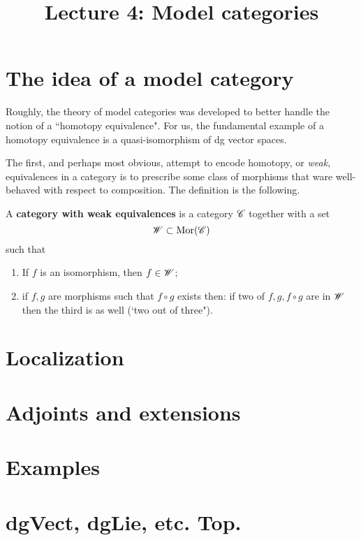 \documentclass[11pt]{amsart}
\title{Lecture 4: Model categories}
\begin{document}
\section{The idea of a model category}
Roughly, the theory of model categories was developed to better handle the notion of a ``homotopy equivalence". 
For us, the fundamental example of a homotopy equivalence is a quasi-isomorphism of dg vector spaces. 

The first, and perhaps most obvious, attempt to encode homotopy, or {\em weak}, equivalences in a category is to prescribe some class of morphisms that ware well-behaved with respect to composition. 
The definition is the following. 

\begin{dfn}
A {\bf category with weak equivalences} is a category $\mathscr C$ together with a set
\[
\mathscr W \subset {\rm Mor}(\mathscr C)
\]
such that
\begin{enumerate}
\item If $f$ is an isomorphism, then $f \in \mathscr W$;
\item if $f,g$ are morphisms such that $f \circ g$ exists then: if two of $f, g, f \circ g$ are in $\mathscr W$ then the third is as well (`two out of three").
\end{enumerate}
\end{dfn}

\section{Localization}


\section{Adjoints and extensions}


\section{Examples}

\section{dgVect, dgLie, etc. Top.}
\end{document}
